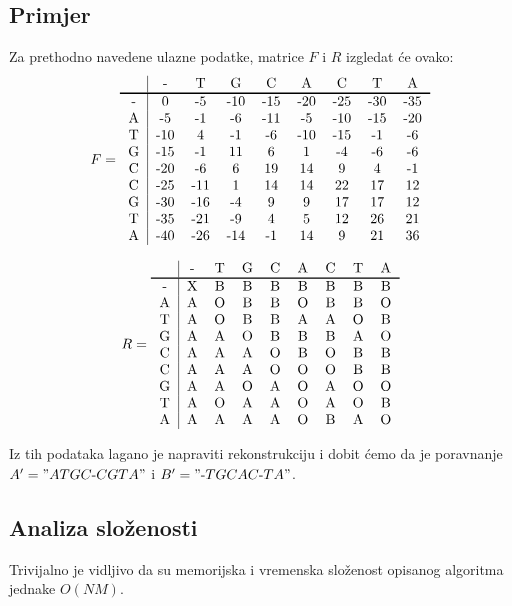 \documentclass[times, utf8, zavrsni]{fer}
\begin{document}
\subsection{Primjer}
Za prethodno navedene ulazne podatke, matrice $F$ i $R$ izgledat će ovako:
$$
F = \begin{tabular}{c|cccccccc}
 & - & T & G & C & A & C & T & A \\\specialrule{1pt}{0pt}{0pt}
- & 0 & -5 & -10 & -15 & -20 & -25 & -30 & -35 \\ 
A & -5 & -1 & -6 & -11 & -5 & -10 & -15 & -20 \\ 
T & -10 & 4 & -1 & -6 & -10 & -15 & -1 & -6 \\ 
G & -15 & -1 & 11 & 6 & 1 & -4 & -6 & -6 \\ 
C & -20 & -6 & 6 & 19 & 14 & 9 & 4 & -1 \\ 
C & -25 & -11 & 1 & 14 & 14 & 22 & 17 & 12 \\ 
G & -30 & -16 & -4 & 9 & 9 & 17 & 17 & 12 \\ 
T & -35 & -21 & -9 & 4 & 5 & 12 & 26 & 21 \\ 
A & -40 & -26 & -14 & -1 & 14 & 9 & 21 & 36 \\ 
\end{tabular}
$$

$$
R = \begin{tabular}{c|cccccccc}
 & - & T & G & C & A & C & T & A \\\specialrule{1pt}{0pt}{0pt}
- & X & B & B & B & B & B & B & B \\ 
A & A & O & B & B & O & B & B & O \\ 
T & A & O & B & B & A & A & O & B \\ 
G & A & A & O & B & B & B & A & O \\ 
C & A & A & A & O & B & O & B & B \\ 
C & A & A & A & O & O & O & B & B \\ 
G & A & A & O & A & O & A & O & O \\ 
T & A & O & A & A & O & A & O & B \\ 
A & A & A & A & A & O & B & A & O \\ 
\end{tabular}
$$

Iz tih podataka lagano je napraviti rekonstrukciju i dobit ćemo da je poravnanje
$A' = "ATGC\mbox{-}CGTA"$ i $B' = "\mbox{-}TGCAC\mbox{-}TA"$.

\subsection{Analiza složenosti}
Trivijalno je vidljivo da su memorijska i vremenska složenost opisanog algoritma 
jednake $O(NM)$. 
\end{document}
